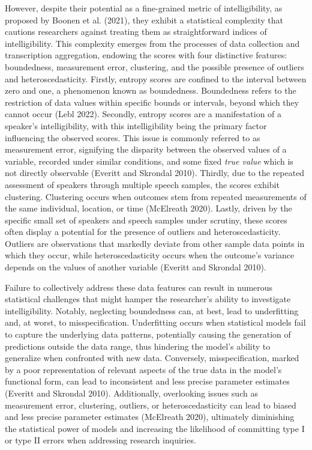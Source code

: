 \documentclass[
sn-apacite
]{sn-jnl}
\begin{document}
However, despite their potential as a fine-grained metric of
intelligibility, as proposed by Boonen et al. (2021), they exhibit a
statistical complexity that cautions researchers against treating them
as straightforward indices of intelligibility. This complexity emerges
from the processes of data collection and transcription aggregation,
endowing the scores with four distinctive features: boundedness,
measurement error, clustering, and the possible presence of outliers and
heteroscedasticity. Firstly, entropy scores are confined to the interval
between zero and one, a phenomenon known as boundedness. Boundedness
refers to the restriction of data values within specific bounds or
intervals, beyond which they cannot occur (Lebl 2022). Secondly, entropy
scores are a manifestation of a speaker's intelligibility, with this
intelligibility being the primary factor influencing the observed
scores. This issue is commonly referred to as measurement error,
signifying the disparity between the observed values of a variable,
recorded under similar conditions, and some fixed \emph{true value}
which is not directly observable (Everitt and Skrondal 2010). Thirdly,
due to the repeated assessment of speakers through multiple speech
samples, the scores exhibit clustering. Clustering occurs when outcomes
stem from repeated measurements of the same individual, location, or
time (McElreath 2020). Lastly, driven by the specific small set of
speakers and speech samples under scrutiny, these scores often display a
potential for the presence of outliers and heteroscedasticity. Outliers
are observations that markedly deviate from other sample data points in
which they occur, while heteroscedasticity occurs when the outcome's
variance depends on the values of another variable (Everitt and Skrondal
2010).

Failure to collectively address these data features can result in
numerous statistical challenges that might hamper the researcher's
ability to investigate intelligibility. Notably, neglecting boundedness
can, at best, lead to underfitting and, at worst, to misspecification.
Underfitting occurs when statistical models fail to capture the
underlying data patterns, potentially causing the generation of
predictions outside the data range, thus hindering the model's ability
to generalize when confronted with new data. Conversely,
misspecification, marked by a poor representation of relevant aspects of
the true data in the model's functional form, can lead to inconsistent
and less precise parameter estimates (Everitt and Skrondal 2010).
Additionally, overlooking issues such as measurement error, clustering,
outliers, or heteroscedasticity can lead to biased and less precise
parameter estimates (McElreath 2020), ultimately diminishing the
statistical power of models and increasing the likelihood of committing
type I or type II errors when addressing research inquiries.
\end{document}
